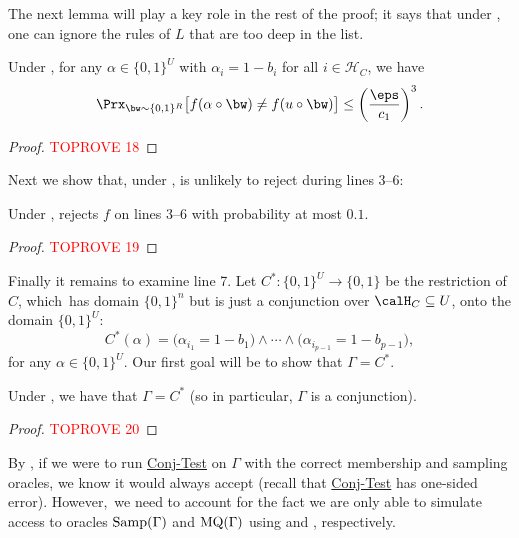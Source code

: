 \documentclass[11pt]{article}
\theoremstyle{definition}
\begin{document}
The next lemma will play a key role in the rest of the proof; it says that under , one can ignore the rules of $L$ that are too deep in the list.
\begin{lemma}\label{thm: subcubes look the same}
Under ,
for any $\alpha\in \{0,1\}^{U}$ with $\alpha_i=1-b_i$ for all $i\in  \mathcal{H}_C$, we have 
\begin{align*}
    \Prx_{\bw \sim \{0,1\}^{R}}\big[f(\alpha \circ \bw) \neq f(u \circ \bw)\big] \leq \left(\frac{\eps}{ c_1}\right)^3.
\end{align*}
\end{lemma}
\begin{proof}\textcolor{red}{TOPROVE 18}\end{proof}


Next we show that, under ,  is unlikely to reject during lines 3--6:

\begin{lemma}\label{lem: f is DL 6-7}
Under ,  rejects $f$ on lines 3--6 with probability at most $0.1$.
\end{lemma}
\begin{proof}\textcolor{red}{TOPROVE 19}\end{proof}

Finally it remains to examine line 7. 
Let $C^*:\{0,1\}^U\rightarrow \{0,1\}$ be the restriction of $C$, which~has domain $\{0,1\}^n$ but is just a conjunction over $\calH_C\subseteq U$, onto the domain $\{0,1\}^U$:
$$
C^*(\alpha)=\big(\alpha_{i_1}=1-b_1\big)\land \cdots \land \big(\alpha_{i_{p-1}}=1-b_{p-1}\big),
$$
{for any $\alpha\in \{0,1\}^U$.}
Our first goal will be to show that $\Gamma=C^*$. 

\begin{lemma}\label{thm: gamma=C}
Under , we have that  $\Gamma=C^*$ (so in particular, $\Gamma$ is a conjunction).
\end{lemma}
\begin{proof}\textcolor{red}{TOPROVE 20}\end{proof}

By , if we were to run 
\hyperlink{Algorithm2}{\sc Conj-Test}
on $\Gamma$ with the correct membership and sampling oracles, we know it would always accept (recall that \hyperlink{Algorithm2}{\sc Conj-Test} has one-sided error). However,~we need to account for the fact we are only able to simulate access to oracles $\mathrm{Samp}(\Gamma)$ and $\mathrm{MQ}(\Gamma)$ using   and , respectively.  
\end{document}
